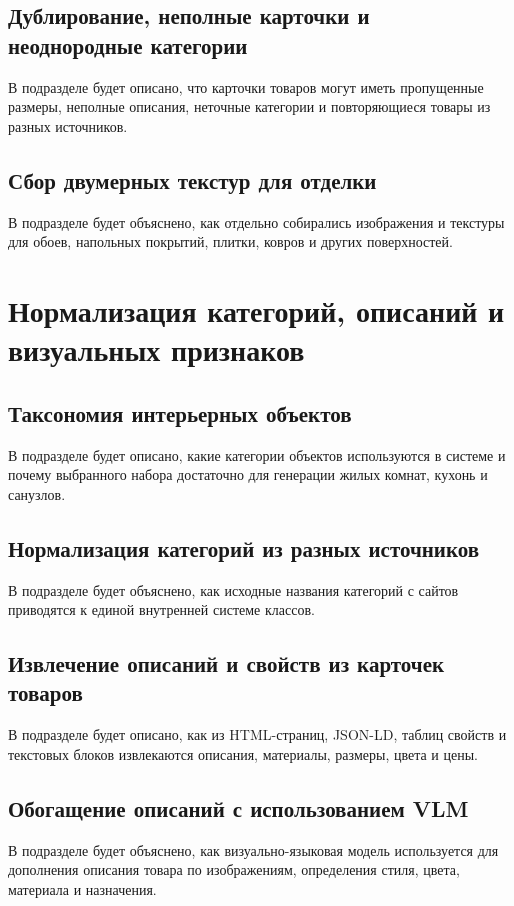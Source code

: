 \documentclass[times]{itmo-student-thesis}
\begin{document}
\subsection{Дублирование, неполные карточки и неоднородные категории}
В подразделе будет описано, что карточки товаров могут иметь пропущенные размеры, неполные описания, неточные категории и повторяющиеся товары из разных источников.

\subsection{Сбор двумерных текстур для отделки}
В подразделе будет объяснено, как отдельно собирались изображения и текстуры для обоев, напольных покрытий, плитки, ковров и других поверхностей.

\section{Нормализация категорий, описаний и визуальных признаков}

\subsection{Таксономия интерьерных объектов}
В подразделе будет описано, какие категории объектов используются в системе и почему выбранного набора достаточно для генерации жилых комнат, кухонь и санузлов.

\subsection{Нормализация категорий из разных источников}
В подразделе будет объяснено, как исходные названия категорий с сайтов приводятся к единой внутренней системе классов.

\subsection{Извлечение описаний и свойств из карточек товаров}
В подразделе будет описано, как из HTML-страниц, JSON-LD, таблиц свойств и текстовых блоков извлекаются описания, материалы, размеры, цвета и цены.

\subsection{Обогащение описаний с использованием VLM}
В подразделе будет объяснено, как визуально-языковая модель используется для дополнения описания товара по изображениям, определения стиля, цвета, материала и назначения.
\end{document}
